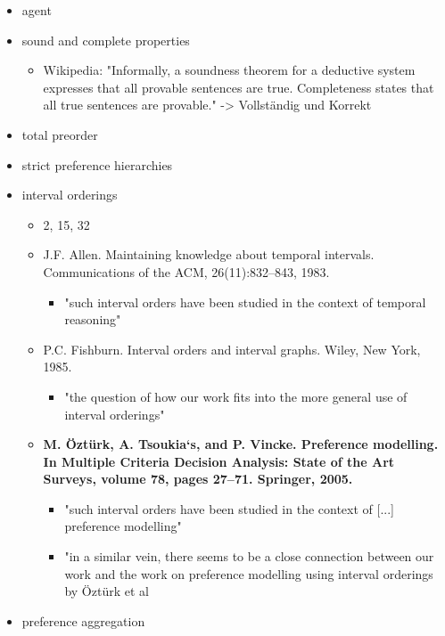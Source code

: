 \documentclass[11pt]{article}
\begin{document}
\begin{itemize}
\begin{itemize}
    \end{itemize}
    \item agent
    \item sound and complete properties
    \begin{itemize}
        \item Wikipedia: "Informally, a soundness theorem for a deductive system expresses that all provable sentences are true. Completeness states that all true sentences are provable." -> Vollständig und Korrekt
    \end{itemize}
    \item total preorder
    \item strict preference hierarchies
    \item interval orderings
    \begin{itemize}
        \item 2, 15, 32
        \item J.F. Allen. Maintaining knowledge about temporal intervals. Communications of the ACM, 26(11):832–843, 1983.
        \begin{itemize}
            \item "such interval orders have been studied in the context of temporal reasoning"
        \end{itemize}
        \item P.C. Fishburn. Interval orders and interval graphs. Wiley, New York, 1985.
        \begin{itemize}
            \item "the question of how our work fits into the more general use of interval orderings"
        \end{itemize}
        \item \textbf{M. Öztürk, A. Tsoukia`s, and P. Vincke. Preference modelling. In Multiple Criteria Decision Analysis: State of the Art Surveys, volume 78, pages 27–71. Springer, 2005.}
        \begin{itemize}
            \item "such interval orders have been studied in the context of [...] preference modelling"
            \item "in a similar vein, there seems to be a close connection between our work and the work on preference modelling using interval orderings by Öztürk et al
        \end{itemize}
    \end{itemize}
    \item preference aggregation
    \begin{itemize}

\end{itemize}
\end{itemize}
\end{document}
